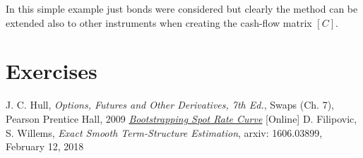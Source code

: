 In this simple example just bonds were considered but clearly the method can be extended also to other instruments when creating the cash-flow matrix $[C]$.

\section{Exercises}


\begin{thebibliography}{9}
 J. C. Hull, \emph{Options, Futures and Other Derivatives, 7th Ed.}, Swaps (Ch. 7), Pearson Prentice Hall, 2009
 \href{https://financetrain.com/bootstrapping-spot-rate-curve-zero-curve}{\emph{Bootstrapping Spot Rate Curve}} [Online]
 D. Filipovic, S. Willems, \emph{Exact Smooth Term-Structure Estimation}, arxiv: 1606.03899, February 12, 2018
\end{thebibliography}
